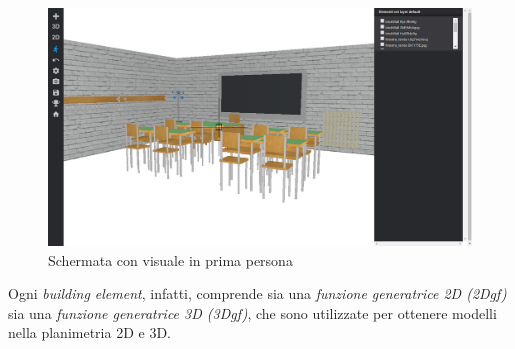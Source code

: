 \begin{figure}[htbp] %
   \centering
   \includegraphics[width=1\linewidth]{images/1d-school}
   \caption{Schermata con visuale in prima persona}
   \label{fig:1D-school}
\end{figure}

Ogni \emph{building element}, infatti, comprende sia una \emph{funzione generatrice 2D (2Dgf)} sia una
\emph{funzione generatrice 3D (3Dgf)}, che sono utilizzate per ottenere modelli nella planimetria 2D e 3D.
\newpage

